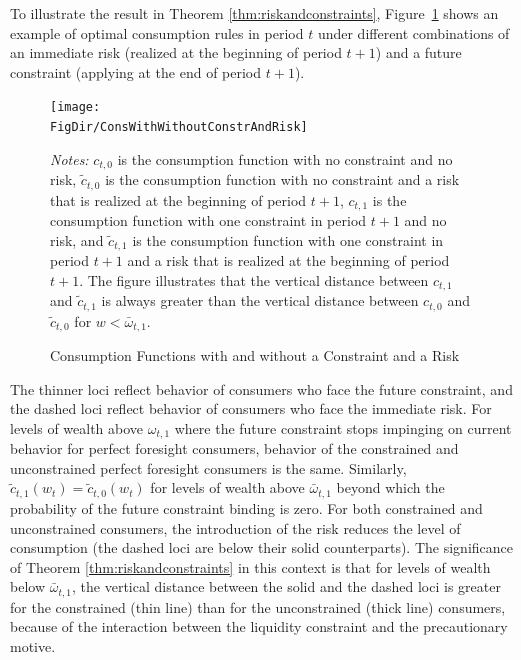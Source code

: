 \documentclass[titlepage]{\econtex}
\providecommand{\wAlt}{\omega}
\begin{document}
  To illustrate the result in Theorem \ref{thm:riskandconstraints}, Figure~\ref{fig:SolveConstrCompare4Cases} shows an example of optimal consumption rules in period $t$ under different combinations of an immediate risk (realized at the beginning of period $t+1$) and a future constraint (applying at the end of period $t+1$).
  \hypertarget{ConsWithWithoutConstrAndRisk}{}
  \begin{figure}[ht]
    {\centering
      \texttt{[image: \\FigDir/ConsWithWithoutConstrAndRisk]}}

    \caption{Consumption Functions with and without a Constraint and a Risk}
    {\footnotesize \begin{singlespace} {\emph{Notes:} $c_{t,0}$ is the consumption function with no constraint and no risk, $\tilde{c}_{t,0}$ is the consumption function with no constraint and a risk that is realized at the beginning of period $t+1$, $c_{t,1}$ is the consumption function with one constraint in period $t+1$ and no risk, and $\tilde{c}_{t,1}$ is the consumption function with one constraint in period $t+1$ and a risk that is realized at the beginning of period $t+1$. The figure illustrates that the vertical distance between $c_{t,1}$ and $\tilde{c}_{t,1}$ is always greater than the vertical distance between $c_{t,0}$ and $\tilde{c}_{t,0}$ for $w < \bar{\omega}_{t,1}$. }  \end{singlespace}}
    \label{fig:SolveConstrCompare4Cases}
  \end{figure}
  The thinner loci reflect behavior of consumers who face the future constraint, and the dashed loci reflect behavior of consumers who face the immediate risk. For levels of wealth above $\wAlt_{t,1}$ where the future constraint stops impinging on current behavior for perfect foresight consumers, behavior of the constrained and unconstrained perfect foresight consumers is the same. Similarly, $\tilde{c}_{t,1}(w_{t}) = \tilde{c}_{t,0}(w_{t})$ for levels of wealth above ${\bar{\wAlt}}_{t,1}$ beyond which the probability of the future constraint binding is zero. For both constrained and unconstrained consumers, the introduction of the risk reduces the level of consumption (the dashed loci are below their solid counterparts). The significance of Theorem \ref{thm:riskandconstraints} in this context is that for levels of wealth below ${\bar{\wAlt}}_{t,1}$, the vertical distance between the solid and the dashed loci is greater for the constrained (thin line) than for the unconstrained (thick line) consumers, because of the interaction between the liquidity constraint and the precautionary motive.
\end{document}
